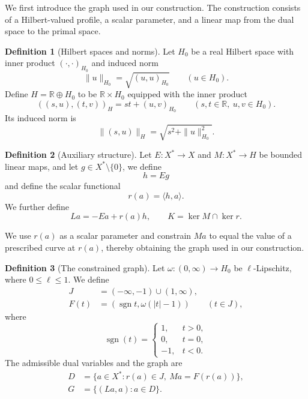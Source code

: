 \documentclass[11pt]{article}
\newcommand{\R}{\mathbb R}
\newcommand{\sgn}{\operatorname{sgn}}
\newcommand{\pair}[2]{\langle #1,#2\rangle}
\theoremstyle{definition}
\newtheorem{definition}{Definition}
\theoremstyle{remark}
\begin{document}
We first introduce the graph used in our construction. The construction consists of a Hilbert-valued profile, a scalar parameter, and a linear map from the dual space to the primal space. 


\begin{definition}[Hilbert spaces and norms]
\label{def:hilbert-spaces-norms}
Let $H_0$ be a real Hilbert space with inner product $(\cdot,\cdot)_{H_0}$ and induced norm
\[
\|u\|_{H_0}=\sqrt{(u,u)_{H_0}}\qquad(u\in H_0).
\]
Define $H=\R\oplus H_0$ to be $\R\times H_0$ equipped with the inner product
\[
((s,u),(t,v))_H=st+(u,v)_{H_0}
\qquad(s,t\in\R,\ u,v\in H_0).
\]
Its induced norm is
\[
\|(s,u)\|_H=\sqrt{s^2+\|u\|_{H_0}^2}.
\]
\end{definition}


\begin{definition}[Auxiliary structure]
\label{def:construction-maps}
Let $E:X^*\to X$ and $M:X^*\to H$ be bounded linear maps, and let
$g\in X^*\setminus\{0\}$, we define 
\[
h=Eg
\]
and define the scalar functional
\[
r(a)=\pair{h}{a}.
\]
We further define
\[
La=-Ea+r(a)h,
\qquad
K=\ker M\cap\ker r.
\]
\end{definition}



We use $r(a)$ as a scalar parameter and constrain $Ma$ to equal the value of a prescribed curve at $r(a)$, thereby obtaining the graph used in our construction.


\begin{definition}[The constrained graph]
\label{def:construction-graph}
Let $\omega:(0,\infty)\to H_0$ be $\ell$-Lipschitz, where $0\le\ell\le1$. We define 
\[
\begin{aligned}
J&=(-\infty,-1)\cup(1,\infty),\\
F(t)&=(\sgn t,\omega(|t|-1))\qquad(t\in J), 
\end{aligned}
\]
where \[
\operatorname{sgn}(t)=
\begin{cases}
1, & t>0,\\
0, & t=0,\\
-1, & t<0.
\end{cases}
\] 
The admissible dual variables and the graph are
\begin{equation}
\begin{aligned}
D&=\{a\in X^*:r(a)\in J,\ Ma=F(r(a))\},\\
G&=\{(La,a):a\in D\}.
\end{aligned}
\label{eq:abs-full-graph}
\end{equation}
\end{definition}
\end{document}

